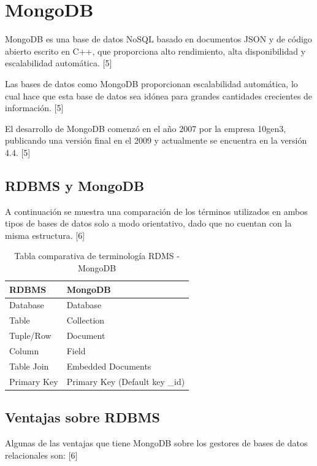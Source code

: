 \documentclass[twocolumn]{article}
\begin{document}
\section{MongoDB}

MongoDB es una base de datos NoSQL basado en documentos JSON y de código abierto escrito en C++, que proporciona alto rendimiento, alta disponibilidad y escalabilidad automática. [5]

Las bases de datos como MongoDB proporcionan escalabilidad automática, lo cual hace que esta base de datos sea idónea para grandes cantidades crecientes de información. [5]

El desarrollo de MongoDB comenzó en el año 2007 por la empresa 10gen3, publicando una versión final en el 2009 y actualmente se encuentra en la versión 4.4. [5]

\subsection{RDBMS y MongoDB}

A continuación se muestra una comparación de los términos utilizados en ambos tipos de bases de datos solo a modo orientativo, dado que no cuentan con la misma estructura. [6]

\begin{table}[h]
\centering
\begin{tabular}{|l|l|}
\hline
\rowcolor[HTML]{67FD9A} 
\textbf{RDBMS} & \textbf{MongoDB}               \\ \hline
Database       & Database                       \\ \hline
Table          & Collection                     \\ \hline
Tuple/Row      & Document                       \\ \hline
Column         & Field                          \\ \hline
Table Join     & Embedded Documents             \\ \hline
Primary Key    & Primary Key (Default key \_id) \\ \hline
\end{tabular}
\caption{Tabla comparativa de terminología RDMS - MongoDB}
\end{table}

\subsection{Ventajas sobre RDBMS}

Algunas de las ventajas que tiene MongoDB sobre los gestores de bases de datos relacionales son: [6]
\end{document}
